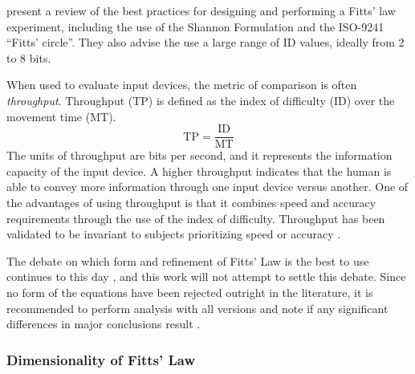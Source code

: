 \citet{soukoreff_towards_2004} present a review of the best practices for designing and performing a Fitts' law experiment, including the use of the Shannon Formulation and the ISO-9241 ``Fitts' circle''.
They also advise the use a large range of ID values, ideally from 2 to 8 bits.


When used to evaluate input devices, the metric of comparison is often \emph{throughput}.
Throughput (TP) is defined as the index of difficulty (ID) over the movement time (MT).
\begin{equation}
    \mathrm{TP} = \frac{\text{ID}}{\text{MT}}
\end{equation}
The units of throughput are bits per second, and it represents the information capacity of the input device.
A higher throughput indicates that the human is able to convey more information through one input device versus another.
One of the advantages of using throughput is that it combines speed and accuracy requirements through the use of the index of difficulty.
Throughput has been validated to be invariant to subjects prioritizing speed or accuracy \citep{mackenzie_fitts_2008}.

The debate on which form and refinement of Fitts' Law is the best to use continues to this day \citep{drewes_only_2010,hoffmann_which_2013}, and this work will not attempt to settle this debate.
Since no form of the equations have been rejected outright in the literature, it is recommended to perform analysis with all versions and note if any significant differences in major conclusions result \citep{soukoreff_towards_2004}.

\subsubsection{Dimensionality of Fitts' Law}\label{dimensionality-of-fitts-law}

